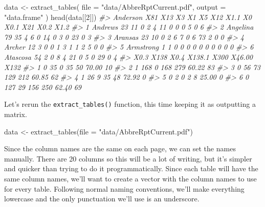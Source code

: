 \documentclass[
]{krantz}
\makeatletter
\newenvironment{Shaded}{\begin{snugshade}}{\end{snugshade}}
\newcommand{\AttributeTok}[1]{\textcolor[rgb]{0.61,0.61,0.61}{#1}}
\newcommand{\CommentTok}[1]{\textcolor[rgb]{0.37,0.37,0.37}{\textit{#1}}}
\newcommand{\DecValTok}[1]{\textcolor[rgb]{0.06,0.06,0.06}{#1}}
\newcommand{\FunctionTok}[1]{\textcolor[rgb]{0,0,0}{#1}}
\newcommand{\NormalTok}[1]{#1}
\newcommand{\OtherTok}[1]{\textcolor[rgb]{0.37,0.37,0.37}{#1}}
\newcommand{\StringTok}[1]{\textcolor[rgb]{0.5,0.5,0.5}{#1}}
\newenvironment{kframe}{%
\medskip{}
\setlength{\fboxsep}{.8em}
 \def\at@end@of@kframe{}%
 \ifinner\ifhmode%
  \def\at@end@of@kframe{\end{minipage}}%
  \begin{minipage}{\columnwidth}%
 \fi\fi%
 \def\FrameCommand##1{\hskip\@totalleftmargin \hskip-\fboxsep
 \colorbox{shadecolor}{##1}\hskip-\fboxsep
     \hskip-\linewidth \hskip-\@totalleftmargin \hskip\columnwidth}%
 \MakeFramed {\advance\hsize-\width
   \@totalleftmargin\z@ \linewidth\hsize
   \@setminipage}}%
 {\par\unskip\endMakeFramed%
 \at@end@of@kframe}
\renewenvironment{Shaded}{\begin{kframe}}{\end{kframe}}
\makeatother
\begin{document}
\begin{Shaded}
\begin{Highlighting}[]
\NormalTok{data }\OtherTok{\textless{}{-}} \FunctionTok{extract\_tables}\NormalTok{(}
  \AttributeTok{file =} \StringTok{"data/AbbreRptCurrent.pdf"}\NormalTok{,}
  \AttributeTok{output =} \StringTok{"data.frame"}
\NormalTok{)}
\FunctionTok{head}\NormalTok{(data[[}\DecValTok{2}\NormalTok{]])}
\CommentTok{\#\textgreater{}    Anderson X81 X13 X3 X1 X5 X12 X1.1 X0 X0.1 X21 X0.2 X1.2}
\CommentTok{\#\textgreater{} 1   Andrews  23  11  0  2  4  11    0  0    0   5    0    6}
\CommentTok{\#\textgreater{} 2  Angelina  79  35  4  6  0  14    0  3    0  23    0    3}
\CommentTok{\#\textgreater{} 3   Aransas  23  10  0  2  6   7    0  6   73   2    0    0}
\CommentTok{\#\textgreater{} 4    Archer  12   3  0  0  1   3    1  1    2   5    0    0}
\CommentTok{\#\textgreater{} 5 Armstrong   1   1  0  0  0   0    0  0    0   0    0    0}
\CommentTok{\#\textgreater{} 6  Atascosa  54   2  0  8  4  21    0  5    0  29    0    4}
\CommentTok{\#\textgreater{}   X0.3 X138 X0.4 X138.1 X300 X46.00 X132}
\CommentTok{\#\textgreater{} 1    0   35    0     35   50  70.00   10}
\CommentTok{\#\textgreater{} 2    1  168    0    168  279  60.22   83}
\CommentTok{\#\textgreater{} 3    0   56   73    129  212  60.85   62}
\CommentTok{\#\textgreater{} 4    1   26    9     35   48  72.92    0}
\CommentTok{\#\textgreater{} 5    0    2    0      2    8  25.00    0}
\CommentTok{\#\textgreater{} 6    0  127   29    156  250  62.40   69}
\end{Highlighting}
\end{Shaded}

Let's rerun the \texttt{extract\_tables()} function, this
time keeping it as outputting a matrix.

\begin{Shaded}
\begin{Highlighting}[]
\NormalTok{data }\OtherTok{\textless{}{-}} \FunctionTok{extract\_tables}\NormalTok{(}\AttributeTok{file =} \StringTok{"data/AbbreRptCurrent.pdf"}\NormalTok{)}
\end{Highlighting}
\end{Shaded}

Since the column names are the same on each page, we can set
the names manually. There are 20 columns so this will be a
lot of writing, but it's simpler and quicker than trying to
do it programmatically. Since each table will have the same
column names, we'll want to create a vector with the column
names to use for every table. Following normal naming
conventions, we'll make everything lowercase and the only
punctuation we'll use is an underscore.
\end{document}
